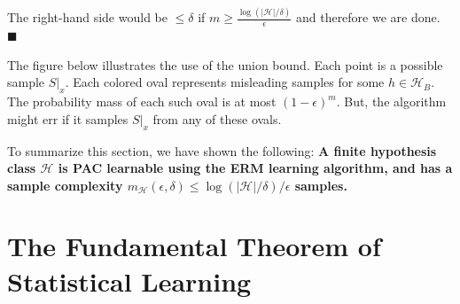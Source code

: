 \documentclass[11pt]{article}
\newcommand{\Hc}{\mathcal{H}}
\begin{document}
The right-hand side would be $\le \delta$ if $m \ge
\frac{\log(|\Hc|/\delta)}{\epsilon}$ and therefore we are done. $\blacksquare$

\vspace{5mm}

The figure below illustrates the use of the union bound. Each point is a possible sample $S|_x$. Each colored oval
  represents misleading samples for some $h \in \Hc_B$. The probability
  mass of each such oval is at most $(1-\epsilon)^{m}$. But, the algorithm
  might err if it samples $S|_x$ from any of these ovals.

\begin{center}
\end{center}

\vspace{5mm}

To summarize this section, we have shown the following:
{\bf A finite hypothesis class $\Hc$ is PAC learnable using the ERM learning algorithm, and has a sample complexity  $m_\Hc(\epsilon,\delta)\leq \log(|\Hc|/\delta)/\epsilon$ samples.}




\section{The Fundamental Theorem of Statistical Learning}
\end{document}
